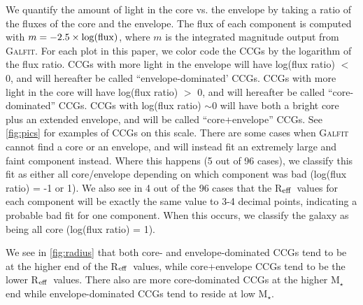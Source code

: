 \documentclass[iop,apj]{emulateapj}
\newcommand{\Reff}{R$_{\rm eff}$}
\begin{document}
We quantify the amount of light in the core vs. the envelope by taking a ratio of the fluxes of the core and the envelope. The flux of each component is computed with $m = -2.5 \times \log({\rm flux})$, where $m$ is the integrated magnitude output from \textsc{Galfit}. For each plot in this paper, we color code the CCGs by the logarithm of the flux ratio. CCGs with more light in the envelope will have log(flux ratio) $<$ 0, and will hereafter be called ``envelope-dominated' CCGs. CCGs with more light in the core will have log(flux ratio) $>$ 0, and will hereafter be called ``core-dominated'' CCGs. CCGs with log(flux ratio) $\sim 0$ will have both a bright core plus an extended envelope, and will be called ``core+envelope'' CCGs. See \autoref{fig:pics} for examples of CCGs on this scale. There are some cases when \textsc{Galfit} cannot find a core or an envelope, and will instead fit an extremely large and faint component instead. Where this happens (5 out of 96 cases), we classify this fit as either all core/envelope depending on which component was bad (log(flux ratio) = -1 or 1). We also see in 4 out of the 96 cases that the \Reff\ values for each component will be exactly the same value to 3-4 decimal points, indicating a probable bad fit for one component. When this occurs, we classify the galaxy as being all core (log(flux ratio) = 1).

We see in \autoref{fig:radius} that both core- and envelope-dominated CCGs tend to be at the higher end of the \Reff\ values, while core+envelope CCGs tend to be the lower \Reff\ values. There also are more core-dominated CCGs at the higher M$_{\star}$ end while envelope-dominated CCGs tend to reside at low M$_{\star}$.
\end{document}
